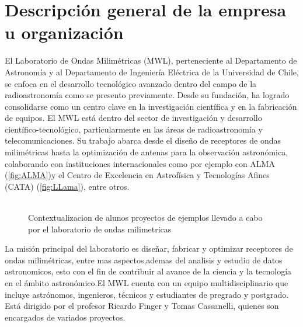 \section{Descripción general de la empresa u organización}
El Laboratorio de Ondas Milimétricas (MWL), perteneciente al Departamento de Astronomía y al Departamento de Ingeniería Eléctrica de la Universidad de Chile, se enfoca en el desarrollo tecnológico avanzado dentro del campo de la radioastronomía como se presento previamente. Desde su fundación, ha logrado consolidarse como un centro clave en la investigación científica y en la fabricación de equipos. El MWL está dentro del sector de investigación y desarrollo científico-tecnológico, particularmente en las áreas de radioastronomía y telecomunicaciones. Su trabajo abarca desde el diseño de receptores de ondas milimétricas hasta la optimización de antenas para la observación astronómica, colaborando con instituciones internacionales como por ejemplo con ALMA (\ref{fig:ALMA})y el Centro de Excelencia en Astrofísica y Tecnologías Afines (CATA) (\ref{fig:LLama}), entre otros.\\\\
\begin{figure}[H]
    \centering
    \quad
    \caption{Contextualizacion de alunos proyectos de ejemplos llevado a cabo por el laboratorio de ondas milimetricas}
    \label{fig:example}
\end{figure}
La misión principal del laboratorio es diseñar, fabricar y optimizar  receptores de ondas milimétricas, entre mas aspectos,ademas del analisis y estudio de datos astronomicos, esto  con el fin de contribuir al avance de la ciencia y la tecnología en el ámbito astronómico.El MWL cuenta con un equipo multidisciplinario que incluye astrónomos, ingenieros, técnicos y estudiantes de pregrado y postgrado. Está dirigido por el profesor Ricardo Finger y Tomas Cassanelli, quienes son encargados de variados proyectos.
\newpage
